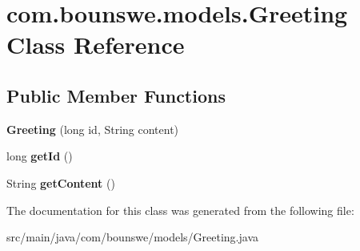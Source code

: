 \hypertarget{classcom_1_1bounswe_1_1models_1_1_greeting}{}\section{com.\+bounswe.\+models.\+Greeting Class Reference}
\label{classcom_1_1bounswe_1_1models_1_1_greeting}
\subsection*{Public Member Functions}
\begin{DoxyCompactItemize}
\item 
\mbox{\label{classcom_1_1bounswe_1_1models_1_1_greeting_af201c331cafc4511af6d23fe3a69aa96}} 
{\bfseries Greeting} (long id, String content)
\item 
\mbox{\label{classcom_1_1bounswe_1_1models_1_1_greeting_a0eefa33d43c209e529b3b8db15333198}} 
long {\bfseries get\+Id} ()
\item 
\mbox{\label{classcom_1_1bounswe_1_1models_1_1_greeting_a3f2163dec4d8bfa758853b682a1548b5}} 
String {\bfseries get\+Content} ()
\end{DoxyCompactItemize}


The documentation for this class was generated from the following file\+:\begin{DoxyCompactItemize}
\item 
src/main/java/com/bounswe/models/Greeting.\+java\end{DoxyCompactItemize}
